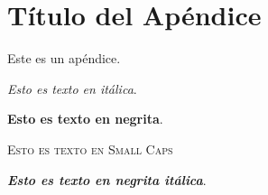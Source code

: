 \chapter{Título del Apéndice} \label{app1}
Este es un apéndice.

\textit{Esto es texto en itálica}.

\textbf{Esto es texto en negrita}.

\textsc{Esto es texto en Small Caps}

\textit{\textbf{Esto es texto en negrita itálica}}.
